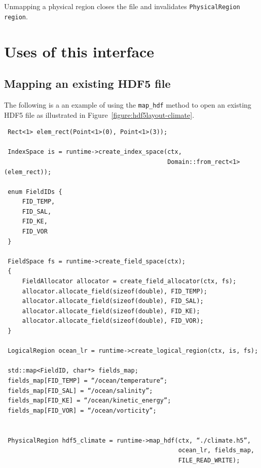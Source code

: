 \documentclass{article}
\begin{document}
Unmapping a physical region closes the file and invalidates
\lstinline{PhysicalRegion region}. 

\section{Uses of this interface}

\subsection{Mapping an existing HDF5 file}

The following is a an example of using the \lstinline{map_hdf} method to
open an existing HDF5 file as illustrated in
Figure~\ref{figure:hdf5layout-climate}. 
\begin{lstlisting}
 Rect<1> elem_rect(Point<1>(0), Point<1>(3));

 IndexSpace is = runtime->create_index_space(ctx,
                                             Domain::from_rect<1>(elem_rect));
 
 enum FieldIDs {
     FID_TEMP,
     FID_SAL,
     FID_KE,
     FID_VOR
 }
 
 FieldSpace fs = runtime->create_field_space(ctx);
 {
     FieldAllocator allocator = create_field_allocator(ctx, fs);
     allocator.allocate_field(sizeof(double), FID_TEMP);
     allocator.allocate_field(sizeof(double), FID_SAL);
     allocator.allocate_field(sizeof(double), FID_KE);
     allocator.allocate_field(sizeof(double), FID_VOR);
 }
 
 LogicalRegion ocean_lr = runtime->create_logical_region(ctx, is, fs);
 
 std::map<FieldID, char*> fields_map;
 fields_map[FID_TEMP] = “/ocean/temperature”;
 fields_map[FID_SAL] = “/ocean/salinity”;
 fields_map[FID_KE] = “/ocean/kinetic_energy”;
 fields_map[FID_VOR] = “/ocean/vorticity”;
 
 
 PhysicalRegion hdf5_climate = runtime->map_hdf(ctx, “./climate.h5”,
                                                ocean_lr, fields_map,
                                                FILE_READ_WRITE);
 
 \end{lstlisting}
\end{document}

